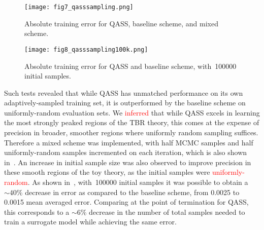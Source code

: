 \begin{figure}
	\centering
	\hspace*{-0.5em}\texttt{[image: fig7\_qasssampling.png]}
	\caption{\label{fig:qasssampling}Absolute training error for QASS, baseline scheme, and mixed scheme.}
\end{figure}

\begin{figure}
	\centering
	\hspace*{-0.5em}\texttt{[image: fig8\_qasssampling100k.png]}
	\caption{\label{fig:qasssampling100k}Absolute training error for QASS and
	baseline scheme, with~\num{100000} initial samples.}
\end{figure}

Such tests revealed that while QASS has unmatched performance on its own
adaptively-sampled training set, it is outperformed by the baseline scheme on
uniformly-random evaluation sets. We \textcolor{red}{inferred} that while QASS excels in
learning the most strongly peaked regions of the TBR theory, this comes at the
expense of precision in broader, smoother regions where uniformly random
sampling suffices. Therefore a mixed scheme was implemented, with half MCMC
samples and half uniformly-random samples incremented on each iteration, which
is also shown in~. An increase in initial sample size was also observed to improve precision in these smooth regions of the toy theory, as
the initial samples were \textcolor{red}{uniformly-random}. As shown
in~, with~\num{100000} initial samples it was
possible to obtain a ${\sim}40\%$ decrease in error as compared to the baseline
scheme, from 0.0025 to 0.0015 mean averaged error. Comparing at the point of
termination for QASS, this corresponds to a ${\sim}6\%$ decrease in the number
of total samples needed to train a surrogate model while achieving the same error. 


